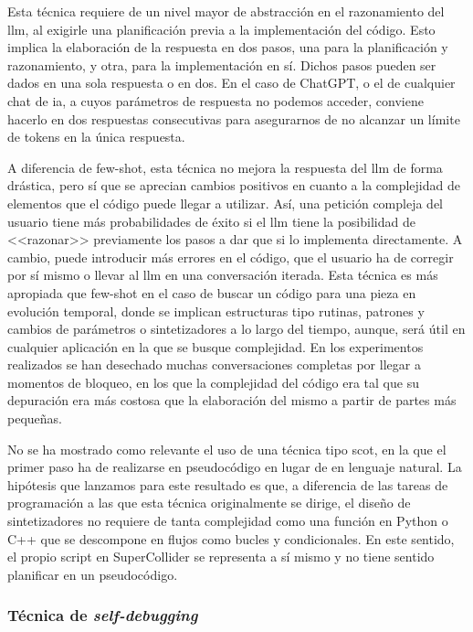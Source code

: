 Esta técnica requiere de un nivel mayor de abstracción en el razonamiento del \gls{llm}, al exigirle una planificación previa a la implementación del código. Esto implica la elaboración de la respuesta en dos pasos, una para la planificación y razonamiento, y otra, para la implementación en sí. Dichos pasos pueden ser dados en una sola respuesta o en dos. En el caso de ChatGPT, o el de cualquier chat de \gls{ia}, a cuyos parámetros de respuesta no podemos acceder, conviene hacerlo en dos respuestas consecutivas para asegurarnos de no alcanzar un límite de tokens en la única respuesta. 

A diferencia de {few-shot}, esta técnica no mejora la respuesta del \gls{llm} de forma drástica, pero sí que se aprecian cambios positivos en cuanto a la complejidad de elementos que el código puede llegar a utilizar. Así, una petición compleja del usuario tiene más probabilidades de éxito si el \gls{llm} tiene la posibilidad de <<razonar>> previamente los pasos a dar que si lo implementa directamente. A cambio, puede introducir más errores en el código, que el usuario ha de corregir por sí mismo o llevar al \gls{llm} en una conversación iterada. Esta técnica es más apropiada que {few-shot} en el caso de buscar un código para una pieza en evolución temporal, donde se implican estructuras tipo rutinas, patrones y cambios de parámetros o sintetizadores a lo largo del tiempo, aunque, será útil en cualquier aplicación en la que se busque complejidad. En los experimentos realizados se han desechado muchas conversaciones completas por llegar a momentos de bloqueo, en los que la complejidad del código era tal que su depuración era más costosa que la elaboración del mismo a partir de partes más pequeñas.

No se ha mostrado como relevante el uso de una técnica tipo \gls{scot}, en la que el primer paso ha de realizarse en pseudocódigo en lugar de en lenguaje natural. La hipótesis que lanzamos para este resultado es que, a diferencia de las tareas de programación a las que esta técnica originalmente se dirige, el diseño de sintetizadores no requiere de tanta complejidad como una función en Python o C++ que se descompone en flujos como bucles y condicionales. En este sentido, el propio script en SuperCollider se representa a sí mismo y no tiene sentido planificar en un pseudocódigo.

\subsubsection{Técnica de \emph{self-debugging}}

